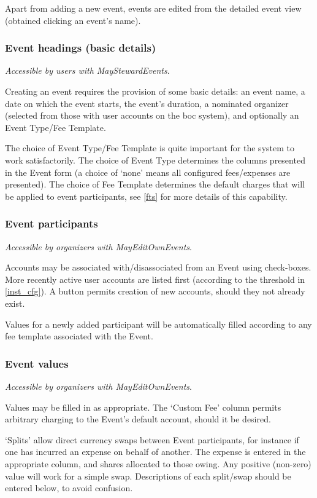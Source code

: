 \documentclass{report}
\begin{document}
Apart from adding a new event, events are edited from the detailed event view (obtained clicking an event's name).

\subsubsection{Event headings (basic details)}

\emph{Accessible by users with MayStewardEvents}.

Creating an event requires the provision of some basic details: an event name, a date on which the event starts, the event's duration, a nominated organizer (selected from those with user accounts on the boc system), and optionally an Event Type/Fee Template.

The choice of Event Type/Fee Template is quite important for the system to work satisfactorily.  The choice of Event Type determines the columns presented in the Event form (a choice of `none' means all configured fees/expenses are presented).  The choice of Fee Template determines the default charges that will be applied to event participants, see \autoref{fts} for more details of this capability.

\subsubsection{Event participants}

\emph{Accessible by organizers with MayEditOwnEvents}.

Accounts may be associated with/disassociated from an Event using check-boxes.  More recently active user accounts are listed first (according to the threshold in \autoref{inst_cfg}).  A button permits creation of new accounts, should they not already exist.

Values for a newly added participant will be automatically filled according to any fee template associated with the Event.

\subsubsection{Event values}

\emph{Accessible by organizers with MayEditOwnEvents}.

Values may be filled in as appropriate.  The `Custom Fee' column permits arbitrary charging to the Event's default account, should it be desired.

`Splits' allow direct currency swaps between Event participants, for instance if one has incurred an expense on behalf of another.  The expense is entered in the appropriate column, and shares allocated to those owing.  Any positive (non-zero) value will work for a simple swap.  Descriptions of each split/swap should be entered below, to avoid confusion.
\end{document}
